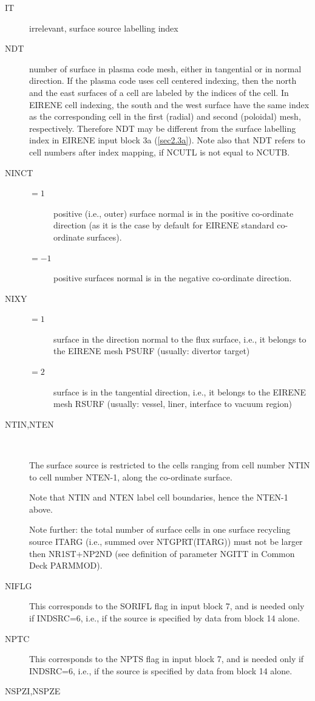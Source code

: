 \begin{description}
  \item[IT] irrelevant, surface source labelling index
  \item[NDT] number of
        surface in plasma code mesh, either in tangential or in normal direction.
        If the plasma code uses cell centered indexing, then the north and the east
        surfaces of a cell are labeled by the indices of the cell.
        In EIRENE cell indexing, the south and the west surface have the same index as
        the corresponding cell in the first (radial) and second (poloidal) mesh,
        respectively.
        Therefore NDT may be different from the surface labelling index in EIRENE input
        block 3a (\cref{sec2.3a}).
        Note also that NDT refers to cell numbers after index mapping, if NCUTL is not
        equal to NCUTB.
  \item[NINCT]
        \begin{description}
          \item[$= 1$] positive (i.e., outer) surface
                normal is in the positive co-ordinate direction (as it is the case by default
                for EIRENE standard co-ordinate surfaces).
          \item[$= -1$] positive surfaces normal is in the negative co-ordinate
                direction.
        \end{description}
  \item[NIXY]
        \begin{description}
          \item[$= 1$] surface in the direction normal to
                the flux surface, i.e., it belongs to the  EIRENE mesh PSURF
                (usually: divertor target)
          \item[$= 2$] surface is in the tangential direction,
                i.e., it belongs to the  EIRENE mesh RSURF (usually: vessel,
                liner, interface to vacuum region)
        \end{description}
  \item[NTIN,NTEN] ~

        The surface source is restricted to the cells ranging from cell number NTIN to
        cell number NTEN-1, along the co-ordinate surface.

        Note that NTIN and NTEN label cell boundaries, hence the NTEN-1 above.

        Note further: the total number of surface cells in one surface recycling source
        ITARG (i.e., summed over NTGPRT(ITARG)) must not be larger then NR1ST+NP2ND
        (see definition of parameter NGITT in Common Deck PARMMOD).
  \item[NIFLG] This corresponds to the SORIFL flag in input block 7, and is
        needed only if INDSRC=6, i.e., if the source is specified by data from block 14
        alone.
  \item[NPTC] This corresponds to the NPTS flag in input block 7, and is needed
        only if INDSRC=6, i.e., if the source is specified by data from block 14 alone.
  \item[NSPZI,NSPZE] ~


\end{description}
